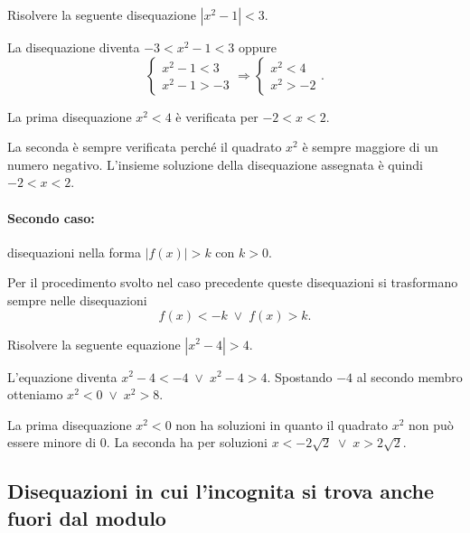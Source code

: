 \begin{exrig}
\begin{esempio}
Risolvere la seguente disequazione $\left|x^2-1\right|<3$.

La disequazione diventa $-3<x^2-1<3$ oppure 
\[\left\{\begin{array}{l}{x^2-1<3}\\{x^2-1>-3}\end{array}\right.\Rightarrow \left\{\begin{array}{l}{x^2<4}\\{x^2>-2}\end{array}\right..\]

La prima disequazione $x^2<4$ è verificata per $-2<x<2$.

La seconda è sempre verificata perché il quadrato $x^2$ è sempre maggiore di un numero negativo.
L'insieme soluzione della disequazione assegnata è quindi $-2<x<2$.

\end{esempio}
\end{exrig}

\paragraph{Secondo caso:} disequazioni nella forma $\left|f(x)\right|>k$ con $ k>0 $.

Per il procedimento svolto nel caso precedente queste disequazioni si trasformano sempre nelle disequazioni \[ f(x)<-k\;\vee\; f(x)>k. \]

\begin{exrig}
\begin{esempio}
Risolvere la seguente equazione $\left|x^2-4\right|>4$.

L'equazione diventa $x^2-4<-4\;\vee\; x^2-4>4$. Spostando $-4$ al secondo membro otteniamo $x^2<0\;\vee\; x^2>8$.

La prima disequazione $x^2<0$ non ha soluzioni in quanto il quadrato $x^2$ non può essere minore di 0.
La seconda ha per soluzioni $x<-2\sqrt 2\;\vee\; x>2\sqrt 2$.
\end{esempio}
\end{exrig}

\subsection{Disequazioni in cui l'incognita si trova anche fuori dal modulo}


